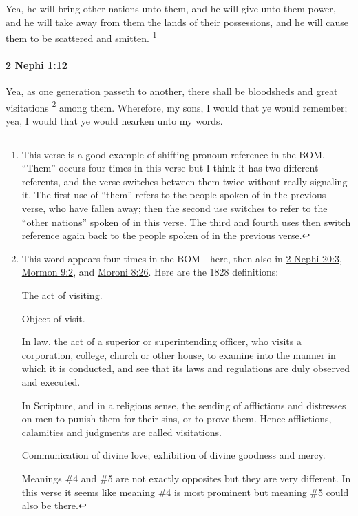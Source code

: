 			Yea, he will bring other nations unto them,
			and he will give unto them power,
			and he will take away from them the lands of their possessions,
			and he will cause them to be scattered and smitten.%
				\footnote{%
					\label{2NEPHI-1-11-pronouns}%
					This verse is a good example of shifting pronoun reference in the BOM. ``Them'' occurs four times in this verse but I think it has two different referents, and the verse switches between them twice without really signaling it. The first use of ``them'' refers to the people spoken of in the previous verse, who have fallen away; then the second use switches to refer to the ``other nations'' spoken of in this verse. The third and fourth uses then switch reference again back to the people spoken of in the previous verse.
					}

		\paragraph{2 Nephi 1:12} %
			\label{2NEPHI-1-12}

			Yea, as one generation passeth to another,
			there shall be bloodsheds and great visitations%
				\footnote{%
					\label{2NEPHI-1-12-visitation}%
					This word appears four times in the BOM---here, then also in \hyperref[2NEPHI-20-3]{2 Nephi 20:3}, \hyperref[MORMON-9-2]{Mormon 9:2}, and \hyperref[MORONI-8-26]{Moroni 8:26}. Here are the 1828 definitions:
						\begin{compactitem}
							\item[1] The act of visiting.
							\item[2] Object of visit.
							\item[3] In law, the act of a superior or superintending officer, who visits a corporation, college, church or other house, to examine into the manner in which it is conducted, and see that its laws and regulations are duly observed and executed.
							\item[4] In Scripture, and in a religious sense, the sending of afflictions and distresses on men to punish them for their sins, or to prove them. Hence afflictions, calamities and judgments are called visitations.
							\item[5] Communication of divine love; exhibition of divine goodness and mercy.
						\end{compactitem}
					Meanings \#4 and \#5 are not exactly opposites but they are very different. In this verse it seems like meaning \#4 is most prominent but meaning \#5 could also be there.
					}
			among them.
			Wherefore, my sons, I would that ye would remember;
			yea, I would that ye would hearken unto my words.

